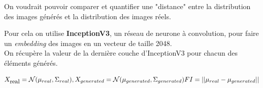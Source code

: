 \documentclass[a0,portrait]{a0poster}
\begin{document}
\begin{multicols}{2}
\begin{tcolorbox}[colback=blue!5!lime,colframe=green!75!black,title={\section*{Comment mesurer les performances d'un GAN?}}]
On voudrait pouvoir comparer et quantifier une "distance" entre la distribution des images générés et la distribution des images réels.

\end{tcolorbox}


\begin{tcolorbox}[colback=blue!5!white,colframe=blue!75!black,title={\section*{FID}}]
 
Pour cela on utilise \textbf{InceptionV3}, un réseau de neurone à convolution, pour faire un \textit{embedding}
des images en un vecteur de taille 2048.\\
On récupère la valeur de la dernière couche d'InceptionV3 pour chacun des éléments générés.

\begin{center}
    $$X_{\mbox{\small real}}=\mathcal{N}(\mu_{real}, \Sigma_{real}), X_{generated}=\mathcal{N}(\mu_{generated}, \Sigma_{generated})\\
    FI = ||\mu_{real} - \mu_{generated}|| $$
\end{center}

\end{tcolorbox}


\begin{tcolorbox}[colback=blue!5!white,colframe=blue!75!black,title,title={\section*{Résultats}}]
\end{tcolorbox}



\begin{tcolorbox}[colback=red!5!orange,colframe=red!75!black,title={\section*{Perspectives}}]
\end{tcolorbox}
\end{multicols}
\end{document}
